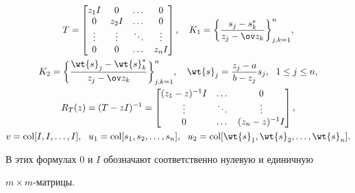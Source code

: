 \begin{gather*}


T=\begin{bmatrix}


z_1 I & 0 & \dotsc & 0 \\


0 & z_2 I & \dotsc & 0 \\


\vdots & \vdots & \ddots & \vdots \\


0 & 0 & \dotsc & z_n I


\end{bmatrix}


, \quad


K_1=\bigg\{ \frac{s_j-s^*_k}{z_j- \ov z_k} \bigg\}_{j,k=1}^{n}, \\


%


K_2=\bigg\{ \frac{\wt{s}_j-\wt{s}^*_k}{z_j -\ov z_k} \bigg\}_{j,k=1}^{n},


\quad \wt {s}_j=\frac{z_j-a}{b-z_j}s_j, \ \ 1 \leq j \leq n, \\


%


R_{T}(z)=(T-zI)^{-1}=


\begin{bmatrix}


(z_1-z)^{-1}I & \dotsc & 0 \\


\vdots & \ddots & \vdots \\


0 & \dotsc & (z_n-z)^{-1} I


\end{bmatrix}


, \\


%


v= \col [I, I, \dotsc, I], \ \


u_1=\col [s_1, s_2, \dotsc, s_n], \ \


u_2=\col [\wt{s}_1, \wt{s}_2, \dotsc, \wt{s}_n ].


\end{gather*}


В этих формулах $0$ и $I$ обозначают соответственно нулевую и единичную


$m \times m$-матрицы.





